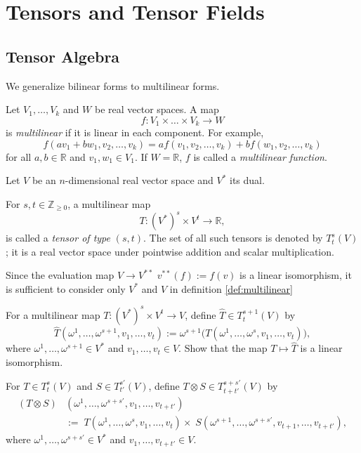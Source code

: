 \section{Tensors and Tensor Fields}

\subsection{Tensor Algebra}

We generalize bilinear forms to multilinear forms.

\begin{definition}
Let $V_1, \dots, V_k$ and $W$ be real vector spaces. A map
\[
f: V_1 \times \dots \times V_k \to W
\]
is \emph{multilinear} if it is linear in each component. For example,
\[
f(a v_1 + b w_1, v_2, \dots, v_k)
= a f(v_1, v_2, \dots, v_k) + b f(w_1, v_2, \dots, v_k)
\]
for all $a,b\in\mathbb{R}$ and $v_1,w_1\in V_1$. If $W=\mathbb{R}$, $f$ is called a \emph{multilinear function}.
\label{def:multilinear}
\end{definition}

\begin{definition}
Let $V$ be an $n$-dimensional real vector space and $V^*$ its dual.

For $s,t \in \mathbb{Z}_{\ge 0}$, a multilinear map
\[
T : (V^*)^s \times V^t \to \mathbb{R},
\]
is called a \emph{tensor of type} $(s,t)$. The set of all such tensors is denoted by $T_t^s(V)$; it is a real vector space under pointwise addition and scalar multiplication.
\end{definition}

\begin{remark}
Since the evaluation map $V \to V^{**}$
$v^{**}(f):= f(v)$ is a linear isomorphism,
it is sufficient to consider only $V^*$ and $V$ in definition \ref{def:multilinear} 
\end{remark}

\begin{problem}
For a multilinear map $T: (V^*)^s \times V^t \to V$, define $\hat{T} \in T_t^{s+1}(V)$ by
\[
\hat{T}(\omega^1, \dots, \omega^{s+1}, v_1, \dots, v_t)
:= \omega^{s+1}\bigl(T(\omega^1, \dots, \omega^s, v_1, \dots, v_t)\bigr),
\]
where $\omega^1, \dots, \omega^{s+1} \in V^*$ and $v_1, \dots, v_t \in V$.
Show that the map $T \mapsto \hat{T}$ is a linear isomorphism.
\end{problem}

\begin{definition}
For $T \in T_t^s(V)$ and $S \in T_{t'}^{s'}(V)$, define $T \otimes S \in T_{t+t'}^{s+s'}(V)$ by
\[
\begin{aligned}
(T \otimes S)&(\omega^1, \dots, \omega^{s+s'}, v_1, \dots, v_{t+t'})\\
&:=\; T(\omega^1, \dots, \omega^s, v_1, \dots, v_t) 
\times\; S(\omega^{s+1}, \dots, \omega^{s+s'}, v_{t+1}, \dots, v_{t+t'}),
\end{aligned}
\]
where $\omega^1, \dots, \omega^{s+s'} \in V^*$ and $v_1, \dots, v_{t+t'} \in V$.
\end{definition}

